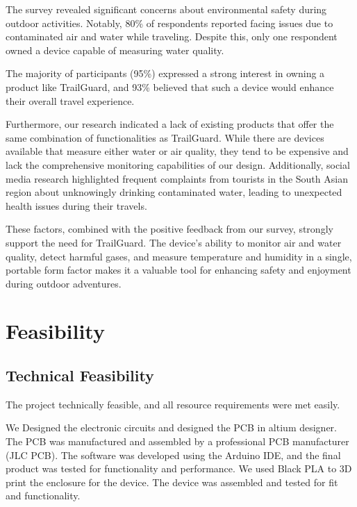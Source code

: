 \documentclass[a4paper,11pt]{article}%
\begin{document}
The survey revealed significant concerns about environmental safety during outdoor activities. Notably, 80\% of respondents reported facing issues due to contaminated air and water while traveling. Despite this, only one respondent owned a device capable of measuring water quality. 

The majority of participants (95\%) expressed a strong interest in owning a product like TrailGuard, and 93\% believed that such a device would enhance their overall travel experience.

Furthermore, our research indicated a lack of existing products that offer the same combination of functionalities as TrailGuard. While there are devices available that measure either water or air quality, they tend to be expensive and lack the comprehensive monitoring capabilities of our design. Additionally, social media research highlighted frequent complaints from tourists in the South Asian region about unknowingly drinking contaminated water, leading to unexpected health issues during their travels.

These factors, combined with the positive feedback from our survey, strongly support the need for TrailGuard. The device’s ability to monitor air and water quality, detect harmful gases, and measure temperature and humidity in a single, portable form factor makes it a valuable tool for enhancing safety and enjoyment during outdoor adventures.

\newpage
\section{Feasibility}
\subsection{Technical Feasibility}
The project technically feasible, and all resource requirements were met easily. 

We Designed the electronic circuits and designed the PCB in altium designer. The PCB was manufactured and assembled by a professional PCB manufacturer (JLC PCB). The software was developed using the Arduino IDE, and the final product was tested for functionality and performance.
We used Black PLA to 3D print the enclosure for the device. The device was assembled and tested for fit and functionality.
\end{document}
